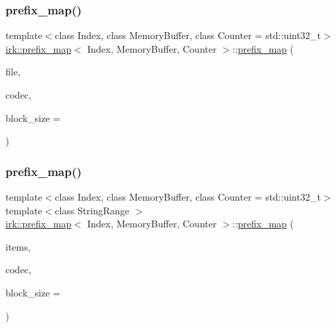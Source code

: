 \subsubsection{\texorpdfstring{prefix\+\_\+map()}{prefix\_map()}\hspace{0.1cm}{\footnotesize\ttfamily [2/3]}}
{\footnotesize\ttfamily template$<$class Index, class Memory\+Buffer, class Counter = std\+::uint32\+\_\+t$>$ \\
\mbox{\hyperlink{classirk_1_1prefix__map}{irk\+::prefix\+\_\+map}}$<$ Index, Memory\+Buffer, Counter $>$\+::\mbox{\hyperlink{classirk_1_1prefix__map}{prefix\+\_\+map}} (\begin{DoxyParamCaption}\item[{fs\+::path}]{file,  }\item[{const std\+::shared\+\_\+ptr$<$ \mbox{\hyperlink{classirk_1_1hutucker__codec}{irk\+::hutucker\+\_\+codec}}$<$ char $>$$>$}]{codec,  }\item[{std\+::size\+\_\+t}]{block\+\_\+size = {} }\end{DoxyParamCaption})\hspace{0.3cm}{\ttfamily [inline]}}

\mbox{\label{classirk_1_1prefix__map_a703e139a8c4453383c8f6ec596ef18f0}} 
\subsubsection{\texorpdfstring{prefix\+\_\+map()}{prefix\_map()}\hspace{0.1cm}{\footnotesize\ttfamily [3/3]}}
{\footnotesize\ttfamily template$<$class Index, class Memory\+Buffer, class Counter = std\+::uint32\+\_\+t$>$ \\
template$<$class String\+Range $>$ \\
\mbox{\hyperlink{classirk_1_1prefix__map}{irk\+::prefix\+\_\+map}}$<$ Index, Memory\+Buffer, Counter $>$\+::\mbox{\hyperlink{classirk_1_1prefix__map}{prefix\+\_\+map}} (\begin{DoxyParamCaption}\item[{const String\+Range \&}]{items,  }\item[{const std\+::shared\+\_\+ptr$<$ \mbox{\hyperlink{classirk_1_1hutucker__codec}{irk\+::hutucker\+\_\+codec}}$<$ char $>$$>$}]{codec,  }\item[{std\+::size\+\_\+t}]{block\+\_\+size = {} }\end{DoxyParamCaption})\hspace{0.3cm}{\ttfamily [inline]}}



